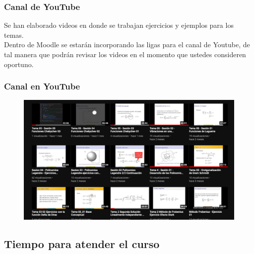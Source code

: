 \documentclass[12pt]{beamer}
\begin{document}
\begin{frame}
\frametitle{Canal de YouTube}
Se han elaborado videos en donde se trabajan ejercicios y ejemplos para los temas.
\\
\bigskip
\pause
Dentro de Moodle se estarán incorporando las ligas para el canal de Youtube, de tal manera que podrán revisar los videos en el momento que ustedes consideren oportuno.
\end{frame}
\begin{frame}
\frametitle{Canal en YouTube}
\begin{figure}[H]
  \centering
  \includegraphics[scale=0.25]{Imagenes/canal_videos.png}
\end{figure}
\end{frame}

\subsection{Tiempo para atender el curso}
\end{document}
